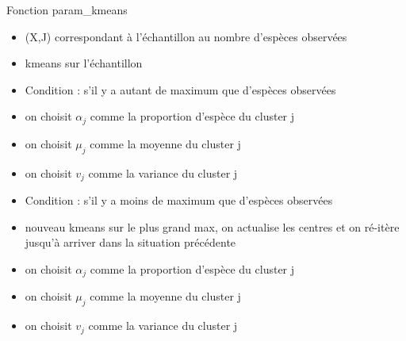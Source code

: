 \documentclass[11pt]{beamer}
\begin{document}
	\begin{frame}
	\scriptsize
		\begin{block}{Fonction param\_kmeans}
			\begin{itemize}
				\item (X,J) correspondant à l'échantillon au nombre d'espèces observées
				\item kmeans sur l'échantillon
				\item Condition : s'il y a autant de maximum que d'espèces observées
				\item on choisit $\alpha_j$ comme la proportion d'espèce du cluster j
				\item on choisit $\mu_j$  comme la moyenne du cluster j
				\item on choisit $v_j$ comme la variance du cluster j 
			\end{itemize}
		\end{block}

			\begin{block}{}
			\begin{itemize}
				\item Condition : s'il y a moins de maximum que d'espèces observées
				\item nouveau kmeans sur le plus grand max, on actualise les centres et on ré-itère jusqu'à arriver dans la situation précédente
				\item on choisit $\alpha_j$ comme la proportion d'espèce du cluster j
				\item on choisit $\mu_j$  comme la moyenne du cluster j
				\item on choisit $v_j$ comme la variance du cluster j 
			\end{itemize}
		\end{block}
	\end{frame}
\end{document}
